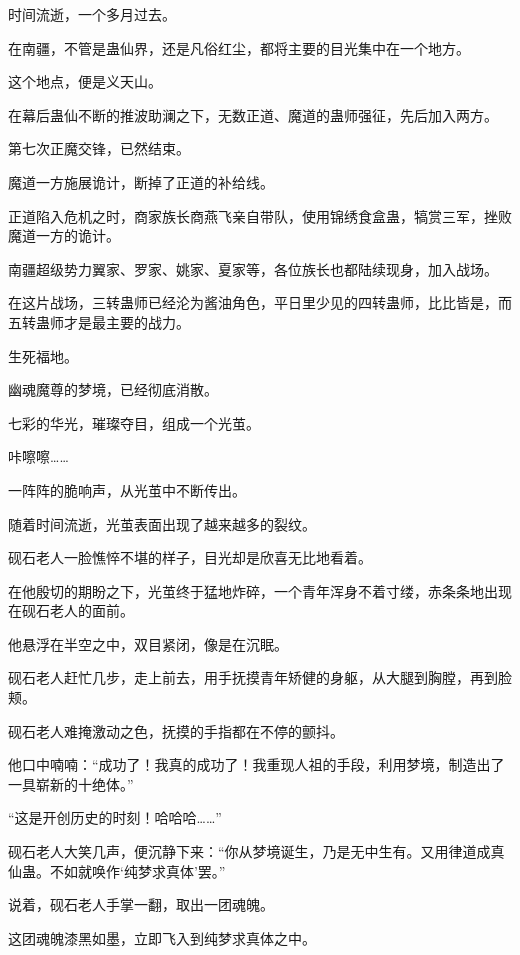 
\begin{this_body}



时间流逝，一个多月过去。

在南疆，不管是蛊仙界，还是凡俗红尘，都将主要的目光集中在一个地方。

这个地点，便是义天山。

在幕后蛊仙不断的推波助澜之下，无数正道、魔道的蛊师强征，先后加入两方。

第七次正魔交锋，已然结束。

魔道一方施展诡计，断掉了正道的补给线。

正道陷入危机之时，商家族长商燕飞亲自带队，使用锦绣食盒蛊，犒赏三军，挫败魔道一方的诡计。

南疆超级势力翼家、罗家、姚家、夏家等，各位族长也都陆续现身，加入战场。

在这片战场，三转蛊师已经沦为酱油角色，平日里少见的四转蛊师，比比皆是，而五转蛊师才是最主要的战力。

生死福地。

幽魂魔尊的梦境，已经彻底消散。

七彩的华光，璀璨夺目，组成一个光茧。

咔嚓嚓……

一阵阵的脆响声，从光茧中不断传出。

随着时间流逝，光茧表面出现了越来越多的裂纹。

砚石老人一脸憔悴不堪的样子，目光却是欣喜无比地看着。

在他殷切的期盼之下，光茧终于猛地炸碎，一个青年浑身不着寸缕，赤条条地出现在砚石老人的面前。

他悬浮在半空之中，双目紧闭，像是在沉眠。

砚石老人赶忙几步，走上前去，用手抚摸青年矫健的身躯，从大腿到胸膛，再到脸颊。

砚石老人难掩激动之色，抚摸的手指都在不停的颤抖。

他口中喃喃：“成功了！我真的成功了！我重现人祖的手段，利用梦境，制造出了一具崭新的十绝体。”

“这是开创历史的时刻！哈哈哈……”

砚石老人大笑几声，便沉静下来：“你从梦境诞生，乃是无中生有。又用律道成真仙蛊。不如就唤作‘纯梦求真体’罢。”

说着，砚石老人手掌一翻，取出一团魂魄。

这团魂魄漆黑如墨，立即飞入到纯梦求真体之中。


\end{this_body}

